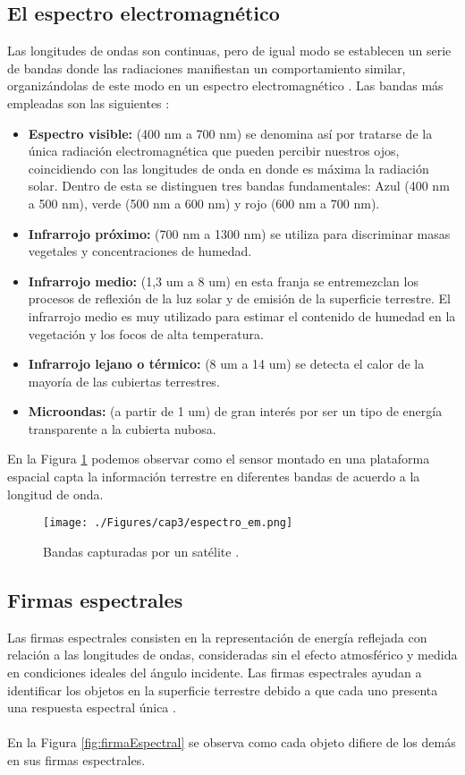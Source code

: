 \subsection{El espectro electromagn\'etico}
Las longitudes de ondas son continuas, pero de igual modo se establecen un serie de bandas donde las radiaciones manifiestan un comportamiento similar, organiz\'andolas de este modo en un espectro electromagn\'etico \cite{remote2010abdulrahman}.
Las bandas m\'as empleadas son las siguientes \cite{salinero2002teledeteccion}:
	\begin{itemize}
		\item \textbf{Espectro visible:} (400 nm a 700 nm) se denomina as\'i por tratarse de la \'unica radiaci\'on electromagn\'etica que pueden percibir nuestros ojos, coincidiendo con las longitudes de onda en donde es m\'axima la radiaci\'on solar. Dentro de esta se distinguen tres bandas fundamentales: Azul (400 nm a 500 nm), verde (500 nm a 600 nm) y rojo (600 nm a 700 nm).
		\item \textbf{Infrarrojo pr\'oximo:} (700 nm a 1300 nm) se utiliza para discriminar masas vegetales y concentraciones de humedad.
		\item \textbf{Infrarrojo medio:} (1,3 um a 8 um) en esta franja se entremezclan los procesos de reflexi\'on de la luz solar y de emisi\'on de la superficie terrestre. El infrarrojo medio es muy utilizado para estimar el contenido de humedad en la vegetaci\'on y los focos de alta temperatura.
		\item \textbf{Infrarrojo lejano o t\'ermico:} (8 um a 14 um) se detecta el calor de la mayor\'ia de las cubiertas terrestres.
		\item \textbf{Microondas:} (a partir de 1 um) de gran inter\'es por ser un tipo de energ\'ia transparente a la cubierta nubosa.
	\end{itemize}
	En la Figura \ref{fig:bandasIs} podemos observar como el sensor montado en una plataforma espacial capta la informaci\'on terrestre en diferentes bandas de acuerdo a la longitud de onda.
	\begin{figure}[H]
		\centering
		\texttt{[image: ./Figures/cap3/espectro\_em.png]}
		\caption{Bandas capturadas por un sat\'elite \cite{teledet2015perce}.}
		\label{fig:bandasIs}
	\end{figure}

\subsection{Firmas espectrales}
Las firmas espectrales consisten en la representaci\'on de energ\'ia reflejada con relaci\'on a las longitudes de ondas, consideradas sin el efecto atmosf\'erico y medida en condiciones ideales del \'angulo incidente. Las firmas espectrales ayudan a identificar los objetos en la superficie terrestre debido a que cada uno presenta una respuesta espectral \'unica \cite{sivakumar2004satellite}.\\~\\
En la Figura \ref{fig:firmaEspectral} se observa como cada objeto difiere de los dem\'as en sus firmas espectrales.

